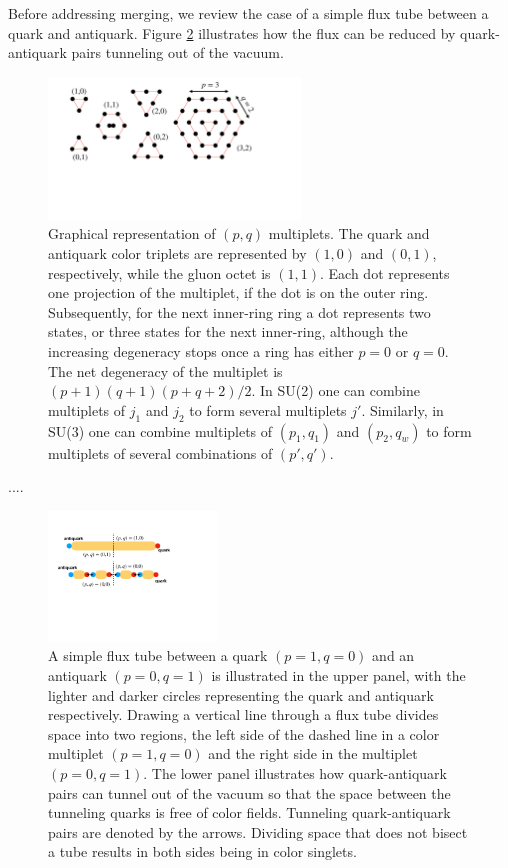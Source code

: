 \documentclass[aps, prc, 12pt, nofootinbib, showpacs, superscriptaddress, tightenlines, groupedaddress]{revtex4-2}
\begin{document}
Before addressing merging, we review the case of a simple flux tube between a quark and antiquark. Figure \ref{fig:simpletube} illustrates how the flux can be reduced by quark-antiquark pairs tunneling out of the vacuum. 
\begin{figure}
\centerline{\includegraphics[width=0.6\textwidth]{figs/pqmultiplet.pdf}}
\caption{\label{fig:pqmultiplet}
Graphical representation of $(p,q)$ multiplets. The quark and antiquark color{} triplets are represented by $(1,0)$ and $(0,1)$, respectively, while the gluon octet is $(1,1)$. Each dot represents one projection of the multiplet, if the dot is on the outer ring. Subsequently, for the next inner-ring ring a dot represents two states, or three states for the next inner-ring, although the increasing degeneracy stops once a ring has either $p=0$ or $q=0$. The net degeneracy of the multiplet is $(p+1)(q+1)(p+q+2)/2$. In SU(2) one can combine multiplets of $j_1$ and $j_2$ to form several multiplets $j'$. Similarly, in SU(3) one can combine multiplets of $(p_1,q_1)$ and $(p_2,q_w)$ to form multiplets of several combinations of $(p',q')$.
}
\end{figure}

....

\begin{figure}
\centerline{\includegraphics[width=0.4\textwidth]{figs/simpletube.pdf}}
\caption{\label{fig:simpletube}
A simple flux tube between a quark $(p=1,q=0)$ and an antiquark $(p=0,q=1)$ is illustrated in the upper panel, with the lighter and darker circles representing the quark and antiquark respectively. Drawing a vertical line through a flux tube divides space into two regions, the left side of the dashed line in a color multiplet $(p=1,q=0)$ and the right side in the multiplet $(p=0,q=1)$. The lower panel illustrates how quark-antiquark pairs can tunnel out of the vacuum so that the space between the tunneling quarks is free of color fields. Tunneling quark-antiquark pairs are denoted by the arrows.  Dividing space that does not bisect a tube results in both sides being in color singlets.
}
\end{figure}
\end{document}

